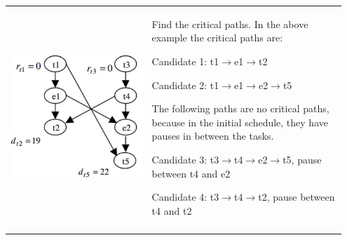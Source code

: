 		\begin{longtable}{p{0.4\linewidth}p{0.55\linewidth}}
			\vspace{0pt}
			
			\includegraphics[scale=0.75]{./pictures/voltage_scheduling_bindings.png}
			&
				\begin{compactenum}
					\item Find the critical paths. In the above example the critical paths are:
					\begin{compactitem}
						\item Candidate 1: t1$\rightarrow$e1$\rightarrow$t2
						\item Candidate 2: t1$\rightarrow$e1$\rightarrow$e2$\rightarrow$t5
					\end{compactitem}
					The following paths are no critical paths, because in the initial schedule, they have pauses in between the tasks. 
					\begin{compactitem}
						\item Candidate 3: t3$\rightarrow$t4$\rightarrow$e2$\rightarrow$t5, pause between t4 and e2
						\item Candidate 4: t3$\rightarrow$t4$\rightarrow$t2, pause between t4 and t2
					\end{compactitem} 
				\end{compactenum}\\
			
			\vspace{0pt}
			

\end{longtable}
